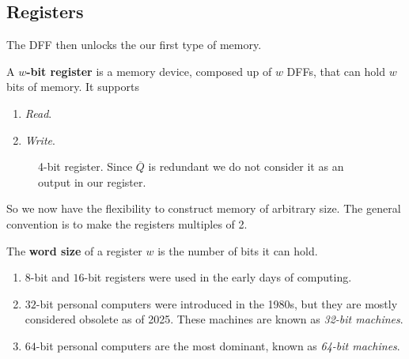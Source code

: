 \subsection{Registers}

  The DFF then unlocks the our first type of memory. 

  \begin{definition}[Register]
    \label{def:register}
    A \textbf{$w$-bit register} is a memory device, composed up of $w$ DFFs, that can hold $w$ bits of memory. It supports 
    \begin{enumerate}
      \item \textit{Read}. 
      \item \textit{Write}. 
    \end{enumerate}

    \begin{figure}[H]
      \centering 
      \caption{4-bit register. Since $\overline{Q}$ is redundant we do not consider it as an output in our register. } 
    \end{figure}
  \end{definition}

  So we now have the flexibility to construct memory of arbitrary size. The general convention is to make the registers multiples of 2. 

  \begin{definition}[Word]
    \label{def:word}
    The \textbf{word size} of a register $w$ is the number of bits it can hold. 
    \begin{enumerate}
      \item $8$-bit and $16$-bit registers were used in the early days of computing. 
      \item $32$-bit personal computers were introduced in the 1980s, but they are mostly considered obsolete as of 2025. These machines are known as \textit{32-bit machines}. 
      \item $64$-bit personal computers are the most dominant, known as \textit{64-bit machines}. 
    \end{enumerate}
  \end{definition} 

